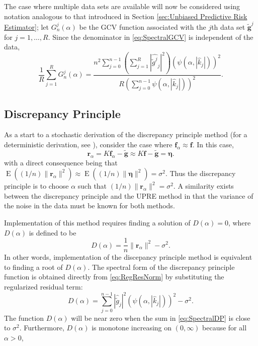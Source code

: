 \documentclass[12pt]{article}
\newcommand{\gnoise}{\widetilde{g}}	%
\newcommand{\gnoiseVec}{\widetilde{\mathbf{g}}}	%
\newcommand{\kMat}{K}	%
\newcommand{\fVec}{\mathbf{f}}	%
\newcommand{\regparam}{\alpha}
\newcommand{\freg}{\fVec_{\regparam}}	%
\newcommand{\mfilt}{\psi}
\newcommand{\noise}{\eta}	%
\newcommand{\noiseSD}{\sigma}	%
\newcommand{\noiseVec}{\bm{\noise}}	%
\newcommand{\E}{\operatorname{E}}	%
\newcommand{\regres}{\mathbf{r}_{\regparam}}	%
\newcommand{\GCV}{G}	%
\newcommand{\D}{D}	%
\begin{document}
The case where multiple data sets are available will now be considered using notation analogous to that introduced in Section \ref{sec:Unbiased Predictive Risk Estimator}; let $\GCV_n^j(\regparam)$ be the GCV function associated with the $j$th data set $\gnoiseVec^j$ for $j = 1,\ldots,R$. Since the denominator in \eqref{eq:SpectralGCV} is independent of the data,
\begin{equation}
\frac{1}{R}\sum_{j=1}^R \GCV_n^j(\regparam)  = \frac{n^2\sum_{j = 0}^{n-1} \left(\sum_{j=1}^R |\widehat{\gnoise^j}_j|^2\right)(\mfilt(\regparam,|\widehat{k}_j|))^2}{R(\sum_{j = 0}^{n-1} \mfilt(\regparam,|\widehat{k}_j|))^2}.
\label{eq:SpectralGCVsum}
\end{equation}

\subsection{Discrepancy Principle} \label{sec:Discrepancy Principle}
As a start to a stochastic derivation of the discrepancy principle method (for a deterministic derivation, see \cite{Vogel:2002}), consider the case where $\freg \approx \fVec$. In this case,
\[\regres = \kMat\freg - \gnoiseVec \approx \kMat\fVec - \gnoiseVec = \noiseVec.\]
with a direct consequence being that $\E((1/n)\|\regres\|^2) \approx \E((1/n)\|\noiseVec\|^2) =\noiseSD^2$. Thus the discrepancy principle is to choose $\regparam$ such that $(1/n)\|\regres\|^2 = \noiseSD^2$. A similarity exists between the discrepancy principle and the UPRE method in that the variance of the noise in the data must be known for both methods. \par 
Implementation of this method requires finding a solution of $\D(\regparam) = 0$, where $\D(\regparam)$ is defined to be
\begin{equation}
\label{eq:DP}
\D(\regparam) = \frac{1}{n}\|\regres\|^2 - \noiseSD^2.
\end{equation}
In other words, implementation of the discepancy principle method is equivalent to finding a root of $\D(\regparam)$. The spectral form of the discrepancy principle function is obtained directly from \eqref{eq:RegResNorm} by substituting the regularized residual term:
\begin{equation}
\D(\regparam) = \sum_{j = 0}^{n-1} |\widehat{\gnoise}_j|^2(\mfilt(\regparam,|\widehat{k}_j|))^2 - \noiseSD^2.
\label{eq:SpectralDP}
\end{equation}
The function $\D(\regparam)$ will be near zero when the sum in \eqref{eq:SpectralDP} is close to $\noiseSD^2$.  Furthermore, $\D(\regparam)$ is monotone increasing on $(0,\infty)$ because for all $\regparam > 0$,
\end{document}
